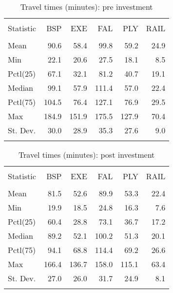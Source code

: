\documentclass{article}\usepackage[]{graphicx}\usepackage[]{color}
\begin{document}
\begin{table}[!htbp] \centering 
  \caption{Travel times (minutes): pre investment} 
  \label{} 
\small 
\begin{tabular}{@{\extracolsep{2pt}}lD{.}{.}{-1} D{.}{.}{-1} D{.}{.}{-1} D{.}{.}{-1} D{.}{.}{-1} } 
\\[-1.8ex]\hline 
\hline \\[-1.8ex] 
Statistic & BSP & EXE & FAL & PLY & RAIL \\ 
\hline \\[-1.8ex] 
Mean & 90.6 & 58.4 & 99.8 & 59.2 & 24.9 \\ 
Min & 22.1 & 20.6 & 27.5 & 18.1 & 8.5 \\ 
Pctl(25) & 67.1 & 32.1 & 81.2 & 40.7 & 19.1 \\ 
Median & 99.1 & 57.9 & 111.4 & 57.0 & 22.4 \\ 
Pctl(75) & 104.5 & 76.4 & 127.1 & 76.9 & 29.5 \\ 
Max & 184.9 & 151.9 & 175.5 & 127.9 & 70.4 \\ 
St. Dev. & 30.0 & 28.9 & 35.3 & 27.6 & 9.0 \\ 
\hline \\[-1.8ex] 
\end{tabular} 
\end{table} 

\begin{table}[!htbp] \centering 
  \caption{Travel times (minutes): post investment} 
  \label{} 
\small 
\begin{tabular}{@{\extracolsep{2pt}}lD{.}{.}{-1} D{.}{.}{-1} D{.}{.}{-1} D{.}{.}{-1} D{.}{.}{-1} } 
\\[-1.8ex]\hline 
\hline \\[-1.8ex] 
Statistic & BSP & EXE & FAL & PLY & RAIL \\ 
\hline \\[-1.8ex] 
Mean & 81.5 & 52.6 & 89.9 & 53.3 & 22.4 \\ 
Min & 19.9 & 18.5 & 24.8 & 16.3 & 7.6 \\ 
Pctl(25) & 60.4 & 28.8 & 73.1 & 36.7 & 17.2 \\ 
Median & 89.2 & 52.1 & 100.2 & 51.3 & 20.1 \\ 
Pctl(75) & 94.1 & 68.8 & 114.4 & 69.2 & 26.6 \\ 
Max & 166.4 & 136.7 & 158.0 & 115.1 & 63.4 \\ 
St. Dev. & 27.0 & 26.0 & 31.7 & 24.9 & 8.1 \\ 
\hline \\[-1.8ex] 
\end{tabular} 
\end{table} 
\end{document}
